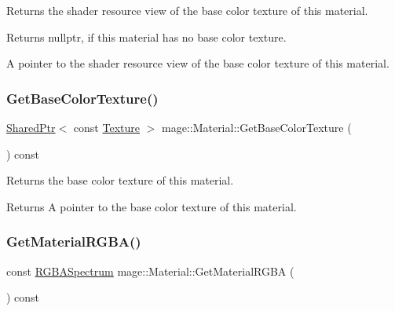 Returns the shader resource view of the base color texture of this material.

\begin{DoxyReturn}{Returns}
{\ttfamily nullptr}, if this material has no base color texture. 

A pointer to the shader resource view of the base color texture of this material. 
\end{DoxyReturn}
\hypertarget{structmage_1_1_material_a76b84c808a281589d60ebbe2e2932c01}{}\label{structmage_1_1_material_a76b84c808a281589d60ebbe2e2932c01} 
\subsubsection{\texorpdfstring{Get\+Base\+Color\+Texture()}{GetBaseColorTexture()}}
{\footnotesize\ttfamily \hyperlink{namespacemage_a1e01ae66713838a7a67d30e44c67703e}{Shared\+Ptr}$<$ const \hyperlink{classmage_1_1_texture}{Texture} $>$ mage\+::\+Material\+::\+Get\+Base\+Color\+Texture (\begin{DoxyParamCaption}{ }\end{DoxyParamCaption}) const\hspace{0.3cm}{\ttfamily [noexcept]}}

Returns the base color texture of this material.

\begin{DoxyReturn}{Returns}
A pointer to the base color texture of this material. 
\end{DoxyReturn}
\hypertarget{structmage_1_1_material_a079997ddbe4a482f1d802bc537329318}{}\label{structmage_1_1_material_a079997ddbe4a482f1d802bc537329318} 
\subsubsection{\texorpdfstring{Get\+Material\+R\+G\+B\+A()}{GetMaterialRGBA()}}
{\footnotesize\ttfamily const \hyperlink{structmage_1_1_r_g_b_a_spectrum}{R\+G\+B\+A\+Spectrum} mage\+::\+Material\+::\+Get\+Material\+R\+G\+BA (\begin{DoxyParamCaption}{ }\end{DoxyParamCaption}) const\hspace{0.3cm}{\ttfamily [noexcept]}}

